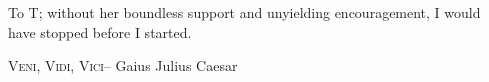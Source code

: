 \newcommand{\centertext}[1]{%
  	\par
	\vspace*{\fill}
	\begin{center}
    #1
    \end{center}
	\vfill
}

\frontmatter

\maketitle

\newpage
\centertext{\begin{minipage}{.6\textwidth}\raggedright To T; without her boundless support and unyielding encouragement, I would have stopped before I started.\end{minipage}}

\newpage
\centertext{{\Large\textsc{Veni, Vidi, Vici}}\linebreak\linebreak -- Gaius Julius Caesar}

\restoregeometry

\tableofcontents